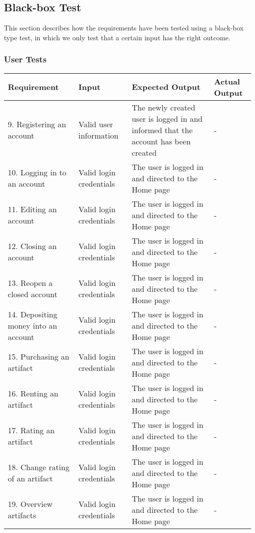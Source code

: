 \subsection{Black-box Test}
This section describes how the requirements have been tested using a black-box type test, in which we only test that a certain input has the right outcome.

\subsubsection{User Tests}
\begin{tabular}{ | p{2cm} | p{2cm} | p{4cm} | p{4cm} | }
	\hline
	Requirement & Input & Expected Output & Actual Output \\
	\hline
	9. Registering an account & Valid user information & The newly created user is logged in and informed that the account has been created & - \\
	\hline
	10. Logging in to an account & Valid login credentials & The user is logged in and directed to the Home page & - \\
	\hline
	11. Editing an account & Valid login credentials & The user is logged in and directed to the Home page & - \\
	\hline
	12. Closing an account & Valid login credentials & The user is logged in and directed to the Home page & - \\
	\hline
	13. Reopen a closed account & Valid login credentials & The user is logged in and directed to the Home page & - \\
	\hline
	14. Depositing money into an account & Valid login credentials & The user is logged in and directed to the Home page & - \\
	\hline
	15. Purchasing an artifact & Valid login credentials & The user is logged in and directed to the Home page & - \\
	\hline
	16. Renting an artifact & Valid login credentials & The user is logged in and directed to the Home page & - \\
	\hline
	17. Rating an artifact & Valid login credentials & The user is logged in and directed to the Home page & - \\
	\hline
	18. Change rating of an artifact & Valid login credentials & The user is logged in and directed to the Home page & - \\
	\hline
	19. Overview artifacts & Valid login credentials & The user is logged in and directed to the Home page & - \\
	\hline

\end{tabular}
